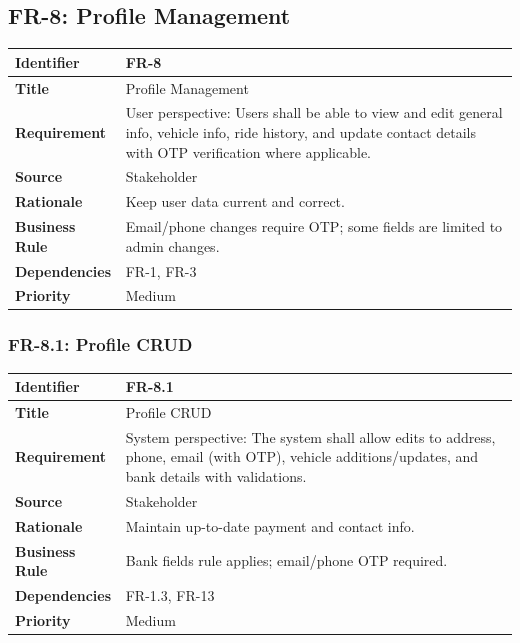 \subsection{FR-8: Profile Management}

\begin{longtable}{|p{3cm}|p{12cm}|}
\hline
\rowcolor{lightgray!30}
\textbf{Identifier} & FR-8 \\
\hline
\textbf{Title} & Profile Management \\
\hline
\textbf{Requirement} & User perspective: Users shall be able to view and edit general info, vehicle info, ride history, and update contact details with OTP verification where applicable. \\
\hline
\textbf{Source} & Stakeholder \\
\hline
\textbf{Rationale} & Keep user data current and correct. \\
\hline
\textbf{Business Rule} & Email/phone changes require OTP; some fields are limited to admin changes. \\
\hline
\textbf{Dependencies} & FR-1, FR-3 \\
\hline
\textbf{Priority} & Medium \\
\hline
\end{longtable}

\subsubsection{FR-8.1: Profile CRUD}

\begin{longtable}{|p{3cm}|p{12cm}|}
\hline
\rowcolor{lightgray!30}
\textbf{Identifier} & FR-8.1 \\
\hline
\textbf{Title} & Profile CRUD \\
\hline
\textbf{Requirement} & System perspective: The system shall allow edits to address, phone, email (with OTP), vehicle additions/updates, and bank details with validations. \\
\hline
\textbf{Source} & Stakeholder \\
\hline
\textbf{Rationale} & Maintain up-to-date payment and contact info. \\
\hline
\textbf{Business Rule} & Bank fields rule applies; email/phone OTP required. \\
\hline
\textbf{Dependencies} & FR-1.3, FR-13 \\
\hline
\textbf{Priority} & Medium \\
\hline
\end{longtable}

